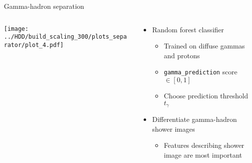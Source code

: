 \begin{frame}{Gamma-hadron separation}
    \begin{columns}[onlytextwidth]
        \begin{column}{0.475\textwidth}
            \centering
            \texttt{[image: ../HDD/build\_scaling\_300/plots\_separator/plot\_4.pdf]}
        \end{column}
        \begin{column}{0.475\textwidth}
            \begin{itemize}
                \setlength\itemsep{1em}
                \item Random forest classifier
                    \begin{itemize}
                        \item Trained on diffuse gammas and protons
                        \item \texttt{gamma\_prediction} score $\in [0, 1]$
                        \item[\textbf{\textcolor{tugreen}{\to}}] Choose prediction threshold $t_\gamma$
                    \end{itemize}
                \item Differentiate gamma-hadron shower images
                    \begin{itemize}
                        \item[\textbf{\textcolor{tugreen}{\to}}] Features describing shower image are most important
                    \end{itemize}
            \end{itemize}
        \end{column}
    \end{columns}

\end{frame}

